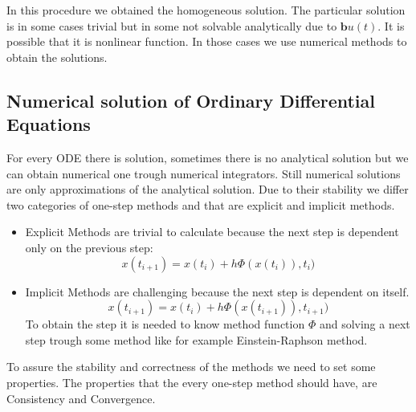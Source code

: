 In this procedure we obtained the homogeneous solution. The particular solution is in some cases trivial but in some not solvable analytically due to $\mathbf{b}u(t)$. It is possible that it is nonlinear function. 
In those cases we use numerical methods to obtain the solutions.

\subsection{Numerical solution of Ordinary Differential Equations}
For every ODE there is solution, sometimes there is no analytical solution but we can obtain numerical one trough numerical integrators. 
Still numerical solutions are only approximations of the analytical solution. Due to their stability we differ two categories of one-step methods and that are explicit and implicit methods.\\
\begin{itemize}
	\item Explicit Methods are trivial to calculate because the next step is dependent only on the previous step:
	\begin{equation}
		x(t_{i+1}) = x(t_i) + h\Phi(x(t_i)),t_i)
	\end{equation}
	\item Implicit Methods are challenging because the next step is dependent on itself.
	\begin{equation}
		x(t_{i+1}) = x(t_i) + h\Phi(x(t_{i+1})),t_{i+1})
	\end{equation}
To obtain the step it is needed to know method function $\Phi$ and solving a next step trough some method like  for example Einstein-Raphson method. 
\end{itemize}
To assure the stability and correctness of the methods we need to set some properties.
The properties that the every one-step method should have, are Consistency and Convergence\cite{num}.\\

